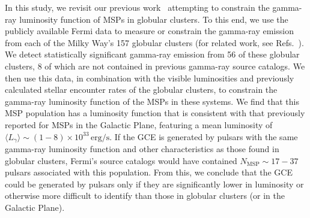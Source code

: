 In this study, we revisit our previous work~\cite{Hooper:2016rap} attempting to constrain the gamma-ray luminosity function of MSPs in globular clusters. To this end, we use the publicly available Fermi data to measure or constrain the gamma-ray emission from each of the Milky Way's 157 globular clusters (for related work, see Refs.~\cite{Hou:2024wpr, ballet2024fermilargeareatelescope,Zhang:2023gwr,Evans:2022zno,Zhang:2022jlx,Yuan:2022egs,deMenezes:2018ilq,Cholis:2014noa,Fermi-LAT:2010gpc}). We detect statistically significant gamma-ray emission from 56 of these globular clusters, 8 of which are not contained in previous
gamma-ray source catalogs. We then use this data, in combination with the visible luminosities and previously calculated stellar encounter rates of the globular clusters, to constrain the gamma-ray luminosity function of the MSPs in these systems. We find that this MSP population has a luminosity function that is consistent with that previously reported for MSPs in the Galactic Plane, featuring a mean luminosity of $\langle L_{\gamma}\rangle \sim (1-8) \times 10^{33} \, \textrm{erg/s}$. If the GCE is generated by pulsars with the same gamma-ray luminosity function and other characteristics as those found in globular clusters, Fermi's source catalogs would have contained $N_\textrm{MSP} \sim 17-37$ pulsars associated with this population. From this, we conclude that the GCE could be generated by pulsars only if they are significantly lower in luminosity or otherwise more difficult to identify than those in globular clusters (or in the Galactic Plane). 

